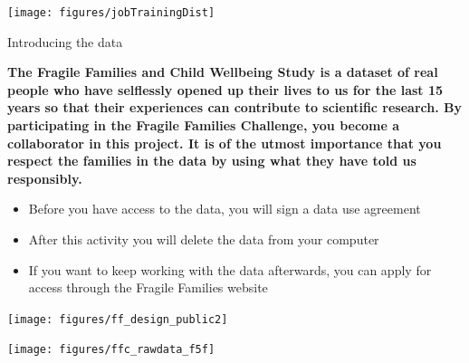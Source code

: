 \documentclass{beamer}
\begin{document}
\begin{frame}

\centering
\texttt{[image: figures/jobTrainingDist]}

\end{frame}
\begin{frame}

\Large{
\begin{center}
Introducing the data
\end{center}
}

\end{frame}
\begin{frame}

\textbf{The Fragile Families and Child Wellbeing Study is a dataset of real people who have selflessly opened up their lives to us for the last 15 years so that their experiences can contribute to scientific research. By participating in the Fragile Families Challenge, you become a collaborator in this project. It is of the utmost importance that you respect the families in the data by using what they have told us responsibly.}

\end{frame}
\begin{frame}

\begin{itemize}
\item Before you have access to the data, you will sign a data use agreement
\pause
\item After this activity you will delete the data from your computer
\pause
\item If you want to keep working with the data afterwards, you can apply for access through the Fragile Families website
\end{itemize}

\end{frame}
\begin{frame}

\begin{center}
\texttt{[image: figures/ff\_design\_public2]}
\end{center}

\end{frame}
\begin{frame}

\begin{center}
\texttt{[image: figures/ffc\_rawdata\_f5f]}
\end{center}

\end{frame}
\end{document}
